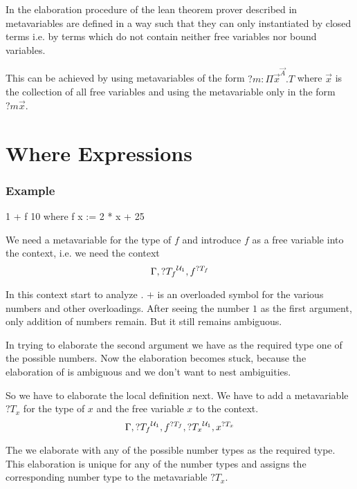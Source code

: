 In the elaboration procedure of the lean theorem prover described in
\cite{demoura2015} metavariables are defined in a way such that they can only
instantiated by closed terms i.e. by terms which do not contain neither free
variables nor bound variables.

This can be achieved by using metavariables of the form $?m: \Pi
\vec{x}^{\vec{A}}.T$ where $\vec{x}$ is the collection of all free variables and
using the metavariable only in the form $?m \vec{x}$.








\section{Where Expressions}


\subsubsection{Example}

\begin{alba}
    1 + f 10
    where
        f x := 2 * x + 25
\end{alba}

We need a metavariable for the type of $f$ and introduce $f$ as a free variable
into the context, i.e. we need the context
$$
    \Gamma, {?T_f}^{{\cal{U}}_1}, f^{?T_f}
$$

In this context start to analyze . $+$ is an overloaded symbol
for the various numbers and other overloadings. After seeing the number $1$ as
the first argument, only addition of numbers remain. But it still remains
ambiguous.

In trying to elaborate the second argument  we have as the required
type one of the possible numbers. Now the elaboration becomes stuck, because the
elaboration of  is ambiguous and we don't want to nest ambiguities.

So we have to elaborate the local definition next. We have to add a metavariable
$?T_x$ for the type of $x$ and the free variable $x$ to the context.
$$
    \Gamma, {?T_f}^{{\cal{U}}_1}, f^{?T_f}, {?T_x}^{{\cal{U}}_1}, x^{?T_x}
$$

The we elaborate  with any of the possible number types as the
required type. This elaboration is unique for any of the number types and
assigns the corresponding number type to the metavariable $?T_x$.

